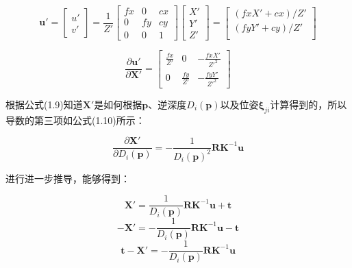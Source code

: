 \begin{equation}
	\bm{u}' = \left[ \begin{array}{c}
		u' \\
		v'
	\end{array}\right] 
	= \frac{1}{Z'}  
		\left[ \begin{array}{ccc}
			fx & 0 & cx \\
			 0 & fy& cy \\
			 0 & 0 & 1 
		\end{array}\right]
		\left[ \begin{array}{c}
			X' \\
			Y' \\
			Z' 
		\end{array}
		\right]
	= \left[ \begin{array}{c}
		(fx X' + cx) / Z' \\
		(fy Y' + cy) / Z' \\
	\end{array}\right]
\end{equation}


\begin{equation}
	\frac{\partial \bm{u}'}{\partial \bm{X}'}
	=
	\left[ 
		\begin{array}{ccc}
			\frac{fx}{Z'} & 0 & -\frac{fxX'}{Z'^2} \\
			0 & \frac{fy}{Z'} & -\frac{fyY'}{Z'^2} 
		\end{array}
	\right]
\end{equation}


根据公式(1.9)知道$\bm{X}'$是如何根据$\bm{p}$、逆深度$D_i(\bm{p})$以及位姿$\bm{\xi}_{ji}$计算得到的，所以导数的第三项如公式(1.10)所示：


\begin{equation}
	\frac{\partial \bm{X}'}{\partial D_i(\bm{p})}
	=
	-\frac{1}{D_i(\bm{p})^2}\bm{R}\bm{K}^{-1} \bm{u}
\end{equation}

进行进一步推导，能够得到：

\begin{equation}
	\bm{X}' = \frac{1}{D_i(\bm{p})} \bm{R} \bm{K}^{-1}\bm{u} + \bm{t}
\end{equation}
\begin{equation}
	-\bm{X}' = -\frac{1}{D_i(\bm{p})} \bm{R} \bm{K}^{-1}\bm{u} - \bm{t}
\end{equation}
\begin{equation}
	\bm{t} -\bm{X}' = -\frac{1}{D_i(\bm{p})} \bm{R} \bm{K}^{-1}\bm{u}
\end{equation}

